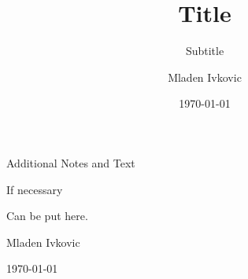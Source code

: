 \title{Title}
\subtitle{Subtitle}
\author{Mladen Ivkovic}
\date{\today}







\begin{titlepage}


\null\vspace{2cm}
{\huge
    \noindent
    Additional Notes and Text 

    If necessary

    Can be put here.
}



\vspace{1cm}

\vspace{8cm}

Mladen Ivkovic

\today

\end{titlepage}

\cleardoubleemptypage
